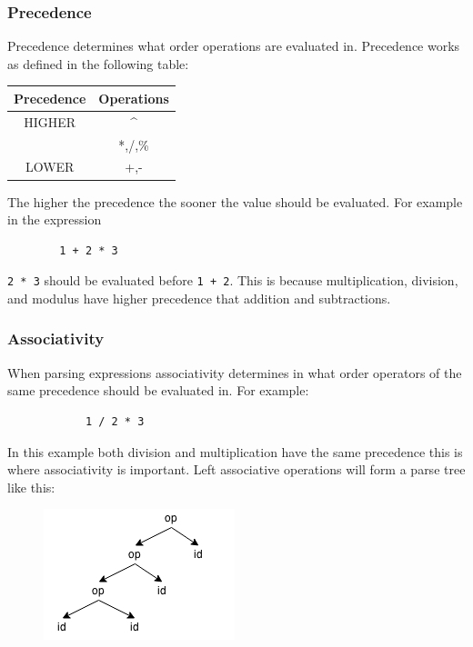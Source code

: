 \documentclass{article}
\newcommand{\code}[1]{\texttt{\textmd{#1}}}
\begin{document}
	\subsubsection{Precedence}
	
		Precedence determines what order operations are evaluated in. Precedence works as defined in the following
		table:
		
		\begin{center}
			\begin{tabular}{|c|c|}
			\hline
			\textbf{Precedence} & \textbf{Operations} \\
			\hline
			HIGHER
			& \textasciicircum \\
			& *,/,\% \\
			LOWER & +,- \\
			\hline
			\end{tabular}
		\end{center}
		
		
		The higher the precedence the sooner the value should be evaluated. For example in the expression

		\begin{lstlisting}
		1 + 2 * 3
		\end{lstlisting}
		
		\code{2 * 3} should be evaluated before \code{1 + 2}. This is because multiplication, division, and modulus
		have higher precedence that addition and subtractions.


	\subsubsection{Associativity} %

		When parsing expressions associativity determines in what order operators of the same precedence should be
		evaluated in. For example:
		
		\begin{lstlisting}
			1 / 2 * 3
		\end{lstlisting}
		
		In this example both division and multiplication have the same precedence this is where associativity is
		important.  Left associative operations will form a parse tree like this:
		
		\begin{figure}[h]
			\centering
			\includegraphics{static/left-assoc-gen.png}
		\end{figure}
		
\end{document}
